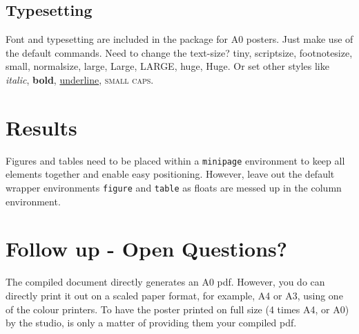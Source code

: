 \documentclass{article}
\begin{document}
\subsection*{Typesetting}
Font and typesetting are included in the package for A0 posters. Just make use of the default \latex commands. Need to change the text-size?
{\tiny tiny}, 
{\scriptsize scriptsize}, 
{\footnotesize footnotesize}, 
{\small small}, 
{\normalsize normalsize}, 
{\large large}, 
{\Large Large}, 
{\LARGE LARGE},
{\huge huge}, 
{\Huge Huge}.
Or set other styles like \textit{italic}, \textbf{bold}, \underline{underline}, \textsc{small caps}.

\pushdown %


\columnbreak %

\section*{Results}
Figures and tables need to be placed within a \verb|minipage| environment to keep all elements together and enable easy positioning.
However, leave out the default \latex wrapper environments \verb|figure| and \verb|table| as floats are messed up in the column environment.




\section*{Follow up - Open Questions?}
The compiled \latex document directly generates an A0 pdf. However, you do can directly print it out on a scaled paper format, for example, A4 or A3, using one of the colour printers.
To have the poster printed on full size (4 times A4, or A0) by the studio, is only a matter of providing them your compiled pdf.
\end{document}

